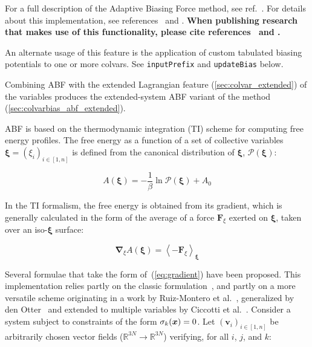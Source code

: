
For a full description of the Adaptive Biasing Force method, see
ref.\ \citealp{Darve2008}. For details about this implementation,
see references~\cite{Henin2004} and \cite{Henin2010}. \textbf{When
publishing research that makes use of this functionality, please cite
references~\cite{Darve2008} and \cite{Henin2010}.}

An alternate usage of this feature is the application of custom
tabulated biasing potentials to one or more colvars. See
\texttt{inputPrefix} and \texttt{updateBias} below.

Combining ABF with the extended Lagrangian feature (\ref{sec:colvar_extended})
of the variables produces the extended-system ABF variant of the method
(\ref{sec:colvarbias_abf_extended}).

ABF is based on the thermodynamic integration (TI) scheme for
computing free energy profiles. The free energy as a function
of a set of collective variables $\bm{\xi}=(\xi_{i})_{i\in[1,n]}$
is defined from the canonical distribution of $\bm{\xi}$, ${\mathcal P}(\bm{\xi})$:

\begin{equation}
  \label{eq:free}
  A\left(\bm{\xi}\right) = -\frac{1}{\beta} \ln {\mathcal P}(\bm{\xi}) + A_0
\end{equation}

In the TI formalism, the free energy is obtained from its gradient,
which is generally calculated in the form of the average of a force
$\bm{F}_\xi$ exerted on $\bm{\xi}$, taken over an iso-$\bm{\xi}$ surface:

\begin{equation}
  \label{eq:gradient}
  \bm{\nabla}_\xi A\left(\bm{\xi}\right) = \left\langle -\bm{F}_\xi \right\rangle_{\bm{\xi}}
\end{equation}

Several formulae that take the form of~(\ref{eq:gradient}) have been
proposed.  This implementation relies partly on the classic
formulation~\cite{Carter1989}, and partly on a more versatile scheme
originating in a work by Ruiz-Montero et al.~\cite{Ruiz-Montero1997},
generalized by den Otter~\cite{denOtter2000} and extended to multiple
variables by Ciccotti et al.~\cite{Ciccotti2005}.  Consider a system
subject to constraints of the form $\sigma_{k}({\mbox{\boldmath{$x$}}}) = 0$.  Let
$(\bm{v}_{i})_{i\in[1,n]}$ be arbitrarily chosen vector fields
($\mathbb{R}^{3N}\rightarrow\mathbb{R}^{3N}$) verifying, for all $i$,
$j$, and $k$:

